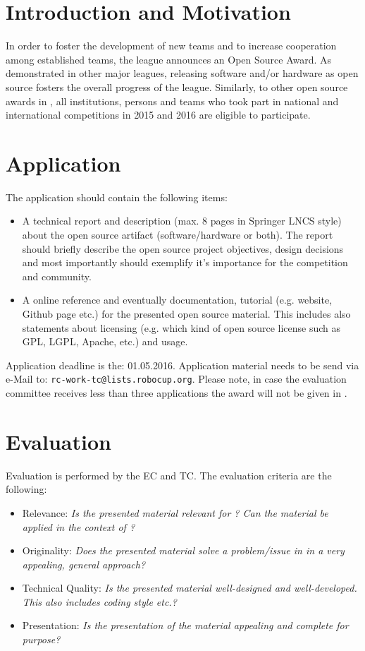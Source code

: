 \section{Introduction and Motivation}
In order to foster the development of new teams and to increase cooperation among established teams, the league announces an Open Source Award. As demonstrated
in other \RC major leagues, releasing software and/or hardware as open source fosters the overall progress of the league. Similarly, to other open source awards in \RC, all institutions, persons and teams who took part in national and international \RCAW competitions in 2015 and 2016 are eligible to participate. 

\section{Application}
The application should contain the following items: 

\begin{itemize}
	\item A technical report and description (max. 8 pages in Springer LNCS style) about the open source artifact (software/hardware or both). The report should briefly describe the open source project objectives, design decisions and most importantly should exemplify it's importance for the \RCAW competition and community.   
	\item A online reference and eventually documentation, tutorial (e.g. website, Github page etc.) for the presented open source material. This includes also statements about licensing (e.g. which kind of open source license such as GPL, LGPL, Apache, etc.) and usage.  
\end{itemize}

Application deadline is the: 01.05.2016. Application material needs to be send via e-Mail to: \texttt{rc-work-tc@lists.robocup.org}. Please note, in case the evaluation committee receives less than three applications the award will not be given in \YEAR. 

\section{Evaluation}
Evaluation is performed by the \RCAW EC and TC. The evaluation criteria are the following:

\begin{itemize}
	\item Relevance: \emph{Is the presented material relevant for \RCAW? Can the material be applied in the context of \RCAW?}
	\item Originality: \emph{Does the presented material solve a problem/issue in \RCAW in a very appealing, general approach?} 
	\item Technical Quality: \emph{Is the presented material well-designed and well-developed. This also includes coding style etc.? }
	\item Presentation: \emph{Is the presentation of the material appealing and complete for \RCAW purpose?}
\end{itemize}

